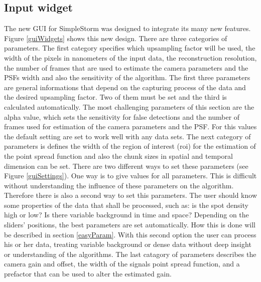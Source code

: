 \subsection{Input widget}
The new GUI for SimpleStorm was designed to integrate its many new features. Figure \ref{guiWidgets} shows this new design. \newline
There are three categories of parameters. The first category specifies which upsampling factor will be used, the width of the pixels in nanometers of the input data, the reconstruction resolution, the number of frames that are used to estimate the camera parameters and the PSFs width and also the sensitivity of the algorithm. The first three parameters are general informations that depend on the capturing process of the data and the desired upsampling factor. Two of them must be set and the third is calculated automatically.\newline
The most challenging parameters of this section are the alpha value, which sets the sensitivity for false detections and the number of frames used for estimation of the camera parameters and the PSF. For this values the default setting are set to work well with any data sets. \newline
The next category of parameters is defines the width of the region of interest (roi) for the estimation of the point spread function and also the chunk sizes in spatial and temporal dimension can be set. There are two different ways to set these parameters (see Figure \ref{guiSettings}). One way is to give values for all parameters. This is difficult without understanding the influence of these parameters on the algorithm. Therefore there is also a second way to set this parameters. The user should know some properties of the data that shall be processed, such as: is the spot density high or low? Is there variable background in time and space? Depending on the sliders' positions, the best parameters are set automatically. How this is done will be described in section \ref{easyParam}. With this second option the user can process his or her data, treating variable background or dense data without deep insight or understanding of the algorithms.\newline
The last catagory of parameters describes the camera gain and offset, the width of the signals point spread function, and a prefactor that can be used to alter the estimated gain. 
